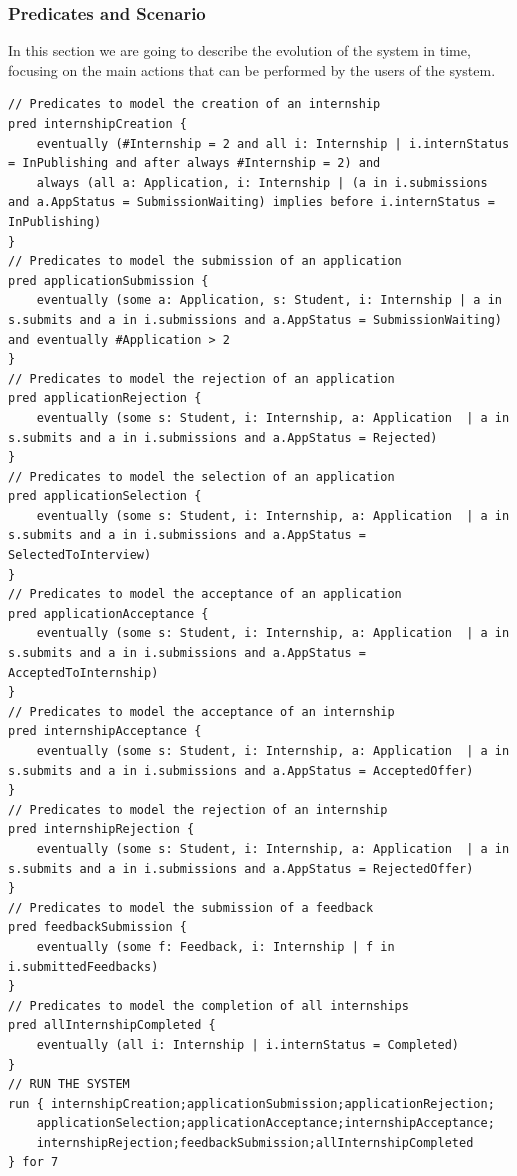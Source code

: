 \subsubsection{Predicates and Scenario}
In this section we are going to describe the evolution of the system in time, 
focusing on the main actions that can be performed by the users of the system.

\begin{lstlisting}
// Predicates to model the creation of an internship
pred internshipCreation {
    eventually (#Internship = 2 and all i: Internship | i.internStatus = InPublishing and after always #Internship = 2) and 
	always (all a: Application, i: Internship | (a in i.submissions and a.AppStatus = SubmissionWaiting) implies before i.internStatus = InPublishing)
}
// Predicates to model the submission of an application
pred applicationSubmission {
    eventually (some a: Application, s: Student, i: Internship | a in s.submits and a in i.submissions and a.AppStatus = SubmissionWaiting) and eventually #Application > 2
}
// Predicates to model the rejection of an application
pred applicationRejection {
    eventually (some s: Student, i: Internship, a: Application  | a in s.submits and a in i.submissions and a.AppStatus = Rejected)
}
// Predicates to model the selection of an application
pred applicationSelection {
    eventually (some s: Student, i: Internship, a: Application  | a in s.submits and a in i.submissions and a.AppStatus = SelectedToInterview)
}
// Predicates to model the acceptance of an application
pred applicationAcceptance {
    eventually (some s: Student, i: Internship, a: Application  | a in s.submits and a in i.submissions and a.AppStatus = AcceptedToInternship)
}
// Predicates to model the acceptance of an internship
pred internshipAcceptance {
    eventually (some s: Student, i: Internship, a: Application  | a in s.submits and a in i.submissions and a.AppStatus = AcceptedOffer)
}
// Predicates to model the rejection of an internship
pred internshipRejection {
    eventually (some s: Student, i: Internship, a: Application  | a in s.submits and a in i.submissions and a.AppStatus = RejectedOffer)
}
// Predicates to model the submission of a feedback
pred feedbackSubmission {
    eventually (some f: Feedback, i: Internship | f in i.submittedFeedbacks)
}
// Predicates to model the completion of all internships
pred allInternshipCompleted {
    eventually (all i: Internship | i.internStatus = Completed)
}
// RUN THE SYSTEM
run { internshipCreation;applicationSubmission;applicationRejection;
    applicationSelection;applicationAcceptance;internshipAcceptance;
    internshipRejection;feedbackSubmission;allInternshipCompleted 
} for 7
\end{lstlisting}

